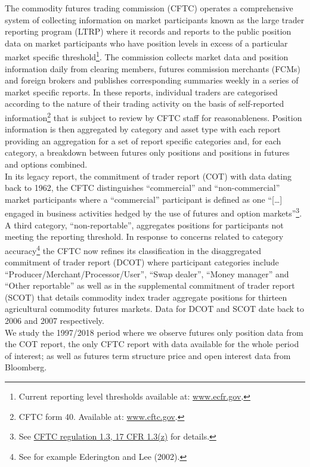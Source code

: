 \documentclass[]{elsarticle} %
\begin{document}
The commodity futures trading commission (CFTC) operates a comprehensive system of collecting information on market participants known as the large trader reporting program (LTRP) where it records and reports to the public position data on market participants who have position levels in excess of a particular market specific threshold\footnote{Current reporting level thresholds available at: \href{https://www.ecfr.gov/cgi-bin/retrieveECFR?gp=\&SID=970471b8455f4bab7db4110cfde50731\&mc=true\&r=SECTION\&n=se17.1.15_103}{www.ecfr.gov}.}. The commission collects market data and position information daily from clearing members, futures commission merchants (FCMs) and foreign brokers and publishes corresponding summaries weekly in a series of market specific reports. In these reports, individual traders are categorised according to the nature of their trading activity on the basis of self-reported information\footnote{CFTC form 40. Available at: \href{https://www.cftc.gov/sites/default/files/idc/groups/public/@forms/documents/file/cftcform40.pdf}{www.cftc.gov}.} that is subject to review by CFTC staff for reasonableness. Position information is then aggregated by category and asset type with each report providing an aggregation for a set of report specific categories and, for each category, a breakdown between futures only positions and positions in futures and options combined.\\
In its legacy report, the commitment of trader report (COT) with data dating back to 1962, the CFTC distinguishes ``commercial'' and ``non-commercial'' market participants where a ``commercial'' participant is defined as one ``{[}\ldots{]} engaged in business activities hedged by the use of futures and option markets''\footnote{See \href{https://www.gpo.gov/fdsys/pkg/CFR-1998-title17-vol1/xml/CFR-1998-title17-vol1-sec1-3.xml}{CFTC regulation 1.3, 17 CFR 1.3(z)} for details.}. A third category, ``non-reportable'', aggregates positions for participants not meeting the reporting threshold. In response to concerns related to category accuracy\footnote{See for example Ederington and Lee (2002).} the CFTC now refines its classification in the disaggregated commitment of trader report (DCOT) where participant categories include ``Producer/Merchant/Processor/User'', ``Swap dealer'', ``Money manager'' and ``Other reportable'' as well as in the supplemental commitment of trader report (SCOT) that details commodity index trader aggregate positions for thirteen agricultural commodity futures markets. Data for DCOT and SCOT date back to 2006 and 2007 respectively.\\
We study the 1997/2018 period where we observe futures only position data from the COT report, the only CFTC report with data available for the whole period of interest; as well as futures term structure price and open interest data from Bloomberg.
\end{document}

